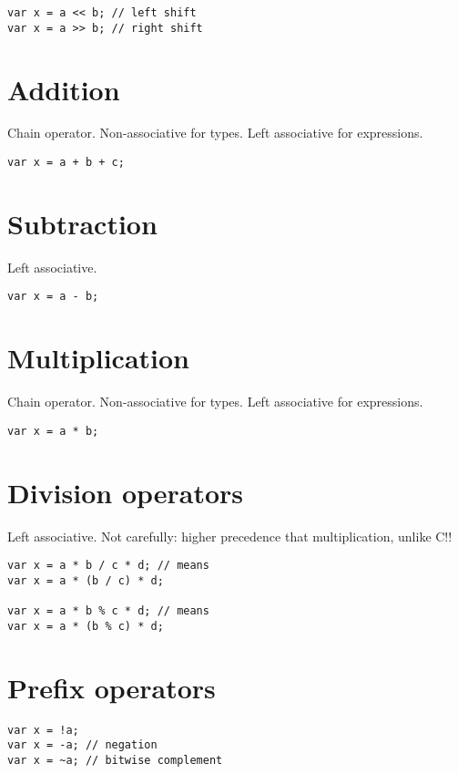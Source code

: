 \documentclass[oneside]{book}
\begin{document}
\begin{verbatim}
var x = a << b; // left shift
var x = a >> b; // right shift
\end{verbatim}


\section{Addition}
Chain operator. Non-associative for types. 
Left associative for expressions.

\begin{verbatim}
var x = a + b + c;
\end{verbatim}


\section{Subtraction}
Left associative.

\begin{verbatim}
var x = a - b;
\end{verbatim}


\section{Multiplication}
Chain operator. Non-associative for types.
Left associative for expressions.

\begin{verbatim}
var x = a * b;
\end{verbatim}


\section{Division operators}
Left associative. Not carefully: higher precedence
that multiplication, unlike C!!

\begin{verbatim}
var x = a * b / c * d; // means
var x = a * (b / c) * d;

var x = a * b % c * d; // means
var x = a * (b % c) * d;
\end{verbatim}


\section{Prefix operators}

\begin{verbatim}
var x = !a;
var x = -a; // negation
var x = ~a; // bitwise complement
\end{verbatim}
\end{document}
